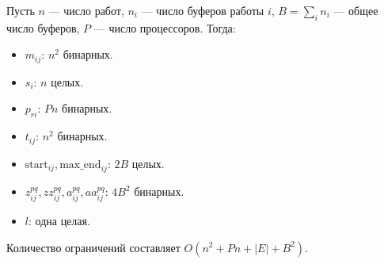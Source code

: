 Пусть $n$ — число работ, $n_i$ — число буферов работы $i$, $B=\sum_i n_i$ — общее число буферов, $P$ — число процессоров. Тогда:
\begin{itemize}
	\item $m_{ij}$: $n^2$ бинарных.
	\item $s_i$: $n$ целых.
	\item $p_{ri}$: $P n$ бинарных.
	\item $t_{ij}$: $n^2$ бинарных.
	\item $\text{start}_{ij},\text{max\_end}_{ij}$: $2B$ целых.
	\item $z_{ij}^{pq}, zz_{ij}^{pq}, a_{ij}^{pq}, aa_{ij}^{pq}$: $4B^2$ бинарных.
	\item $l$: одна целая.
\end{itemize}
Количество ограничений составляет $O(n^2 + P n + |E| + B^2)$.